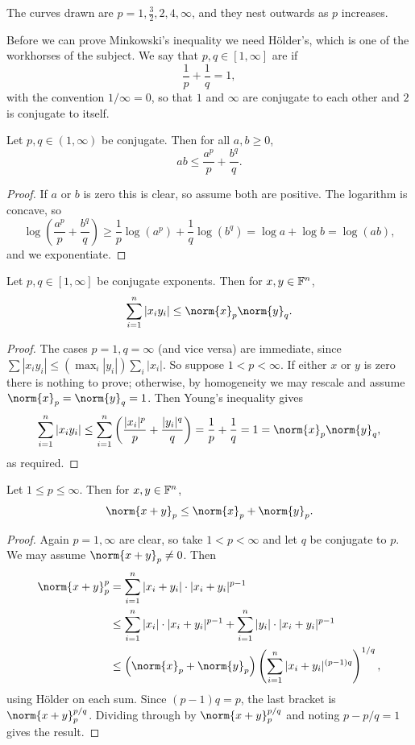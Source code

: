 \documentclass[a4paper]{scrartcl}
\begin{document}
The curves drawn are $p = 1, \frac32, 2, 4, \infty$, and they nest outwards as $p$ increases.

Before we can prove Minkowski's inequality we need Hölder's, which is one of the workhorses of the subject. We say that $p, q \in [1, \infty]$ are  if
$$\frac{1}{p} + \frac{1}{q} = 1,$$
with the convention $1/\infty = 0$, so that $1$ and $\infty$ are conjugate to each other and $2$ is conjugate to itself.

\begin{lemma}
	Let $p, q \in (1, \infty)$ be conjugate. Then for all $a, b \geq 0$,
	$$ab \leq \frac{a^p}{p} + \frac{b^q}{q}.$$
\end{lemma}

\begin{proof}
	If $a$ or $b$ is zero this is clear, so assume both are positive. The logarithm is concave, so
	$$\log\left( \frac{a^p}{p} + \frac{b^q}{q} \right) \geq \frac{1}{p} \log(a^p) + \frac{1}{q} \log(b^q) = \log a + \log b = \log(ab),$$
	and we exponentiate.
\end{proof}

\begin{proposition}
	Let $p, q \in [1, \infty]$ be conjugate exponents. Then for $x, y \in \mathbb{F}^n$,
	$$\sum_{i=1}^n |x_i y_i| \leq \norm{x}_p \norm{y}_q.$$
\end{proposition}

\begin{proof}
	The cases $p = 1, q = \infty$ (and vice versa) are immediate, since $\sum |x_iy_i| \leq (\max_i |y_i|) \sum_i |x_i|$. So suppose $1 < p < \infty$. If either $x$ or $y$ is zero there is nothing to prove; otherwise, by homogeneity we may rescale and assume $\norm{x}_p = \norm{y}_q = 1$. Then Young's inequality gives
	$$\sum_{i=1}^n |x_i y_i| \leq \sum_{i=1}^n \left( \frac{|x_i|^p}{p} + \frac{|y_i|^q}{q} \right) = \frac{1}{p} + \frac{1}{q} = 1 = \norm{x}_p \norm{y}_q,$$
	as required.
\end{proof}

\begin{proposition}
	Let $1 \leq p \leq \infty$. Then for $x, y \in \mathbb{F}^n$,
	$$\norm{x + y}_p \leq \norm{x}_p + \norm{y}_p.$$
\end{proposition}

\begin{proof}
	Again $p = 1, \infty$ are clear, so take $1 < p < \infty$ and let $q$ be conjugate to $p$. We may assume $\norm{x+y}_p \neq 0$. Then
	\begin{align*}
		\norm{x+y}_p^p &= \sum_{i=1}^n |x_i + y_i| \cdot |x_i + y_i|^{p-1} \\
		&\leq \sum_{i=1}^n |x_i| \cdot |x_i + y_i|^{p-1} + \sum_{i=1}^n |y_i| \cdot |x_i + y_i|^{p-1} \\
		&\leq \left( \norm{x}_p + \norm{y}_p \right) \left( \sum_{i=1}^n |x_i + y_i|^{(p-1)q} \right)^{1/q},
	\end{align*}
	using Hölder on each sum. Since $(p-1)q = p$, the last bracket is $\norm{x+y}_p^{p/q}$. Dividing through by $\norm{x+y}_p^{p/q}$ and noting $p - p/q = 1$ gives the result.
\end{proof}
\end{document}
